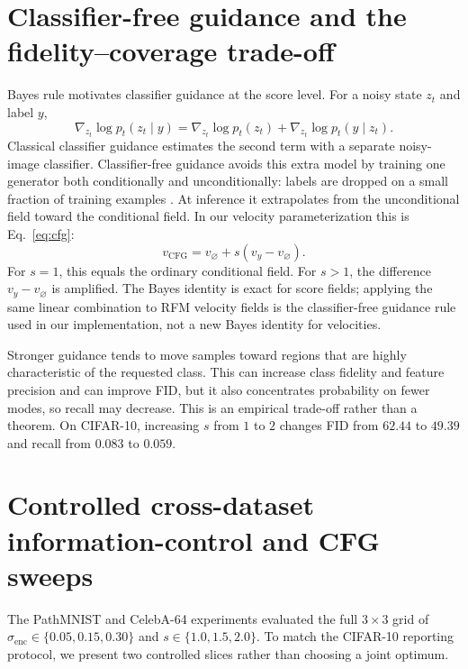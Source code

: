 \documentclass{article}
\begin{document}
\section{Classifier-free guidance and the fidelity--coverage trade-off}
\label{app:cfg}
Bayes rule motivates classifier guidance at the score level. For a noisy state $z_t$ and label $y$,
\begin{equation}
 \nabla_{z_t}\log p_t(z_t\mid y)
 =\nabla_{z_t}\log p_t(z_t)+\nabla_{z_t}\log p_t(y\mid z_t).
\end{equation}
Classical classifier guidance estimates the second term with a separate noisy-image classifier. Classifier-free guidance avoids this extra model by training one generator both conditionally and unconditionally: labels are dropped on a small fraction of training examples \cite{cfg}. At inference it extrapolates from the unconditional field toward the conditional field. In our velocity parameterization this is Eq.~\eqref{eq:cfg}:
\begin{equation}
 v_{\mathrm{CFG}}=v_{\varnothing}+s(v_y-v_{\varnothing}).
\end{equation}
For $s=1$, this equals the ordinary conditional field. For $s>1$, the difference $v_y-v_{\varnothing}$ is amplified. The Bayes identity is exact for score fields; applying the same linear combination to RFM velocity fields is the classifier-free guidance rule used in our implementation, not a new Bayes identity for velocities.

Stronger guidance tends to move samples toward regions that are highly characteristic of the requested class. This can increase class fidelity and feature precision and can improve FID, but it also concentrates probability on fewer modes, so recall may decrease. This is an empirical trade-off rather than a theorem. On CIFAR-10, increasing $s$ from $1$ to $2$ changes FID from $62.44$ to $49.39$ and recall from $0.083$ to $0.059$.


\section{Controlled cross-dataset information-control and CFG sweeps}
\label{app:crosssweep}
The PathMNIST and CelebA-64 experiments evaluated the full $3\times3$ grid of $\sigma_{\mathrm{enc}}\in\{0.05,0.15,0.30\}$ and $s\in\{1.0,1.5,2.0\}$. To match the CIFAR-10 reporting protocol, we present two controlled slices rather than choosing a joint optimum.
\end{document}
